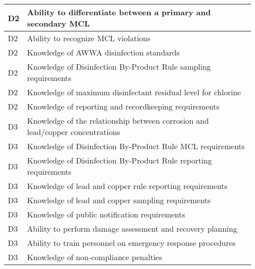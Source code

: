 \begin{table}[H]
\begin{tabular}{| m{1cm} | m{15cm} |}
D2 & Ability to   differentiate between a primary and secondary MCL                                                            \\ \hline
D2 & Ability to recognize   MCL violations                                                                                     \\ \hline
D2 & Knowledge of AWWA   disinfection standards                                                                                \\ \hline
D2 & Knowledge of   Disinfection By-Product Rule sampling requirements                                                         \\ \hline
D2 & Knowledge of maximum   disinfectant residual level for chlorine                                                           \\ \hline
D2 & Knowledge of   reporting and recordkeeping requirements                                                                   \\ \hline
D3 & Knowledge of the   relationship between corrosion and lead/copper concentrations                                          \\ \hline
D3 & Knowledge of   Disinfection By-Product Rule MCL requirements                                                              \\ \hline
D3 & Knowledge of   Disinfection By-Product Rule reporting requirements                                                        \\ \hline
D3 & Knowledge of lead and   copper rule reporting requirements                                                                \\ \hline
D3 & Knowledge of lead and   copper sampling requirements                                                                      \\ \hline
D3 & Knowledge of public   notification requirements                                                                           \\ \hline
D3 & Ability to perform   damage assessment and recovery planning                                                              \\ \hline
D3 & Ability to train   personnel on emergency response procedures                                                             \\ \hline
D3 & Knowledge of   non-compliance penalties                                                                                   \\ \hline

\end{tabular}
\end{table}


